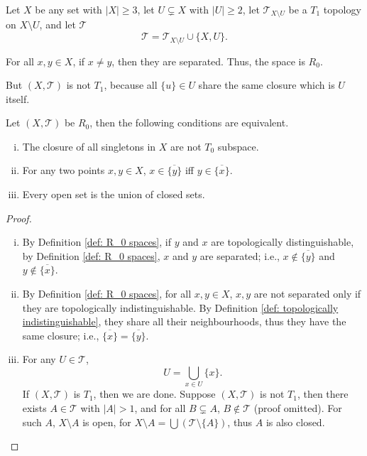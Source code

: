 \begin{example}
	\label{eg: R_0 but not T_1}

	Let $X$ be any set with $|X| \ge 3$, let $U \subsetneq X$ with $|U| \ge 2$, let $\mathcal T_{X \setminus U}$ be a $T_1$ topology on $X \setminus U$, and let $\mathcal T$
	$$
	\mathcal T = \mathcal T_{X \setminus U} \cup \{X, U\}.
	$$

	For all $x,y \in X$, if $x \ne y$, then they are separated. Thus, the space is $R_0$.

	But $(X, \mathcal T)$ is not $T_1$, because all $\{u\} \in U$ share the same closure which is $U$ itself.
\end{example}


\begin{proposition}
	\label{prop: alternative definitions of R_0 spaces}
	Let $(X, \mathcal T)$ be $R_0$, then the following conditions are equivalent.
	\begin{enumerate}[(i)]
		\item
		The closure of all singletons in $X$ are not $T_0$ subspace.

		\item
		For any two points $x,y \in X$, $x \in \overline{ \{y\} }$ iff $y \in \overline{ \{x\} }$.

		\item
		Every open set is the union of closed sets.
	\end{enumerate}

	\begin{proof}
		\
		\begin{enumerate}[(i)]
			\item
			By Definition \ref{def: R_0 spaces}, if $y$ and $x$ are topologically distinguishable, by Definition \ref{def: R_0 spaces}, $x$ and $y$ are separated; i.e., $x \notin \overline {\{y\}}$ and $y \notin \overline{\{x\}}$.

			\item
			By Definition \ref{def: R_0 spaces}, for all $x,y \in X$, $x,y$ are not separated only if they are topologically indistinguishable. By Definition \ref{def: topologically indistinguishable}, they share all their neighbourhoods, thus they have the same closure; i.e., $\overline{\{x\}} = \overline{\{y\}}$.

			\item
			For any $U \in \mathcal T$,
			$$
			U = \bigcup_{x \in U} \{x\}.
			$$
			If $(X, \mathcal T)$ is $T_1$, then we are done. Suppose $(X, \mathcal T)$ is not $T_1$, then there exists $A \in \mathcal T$ with $|A| > 1$, and for all $B \subsetneq A$, $B \notin \mathcal T$ (proof omitted). For such $A$, $X \setminus A$ is open, for $X \setminus A = \bigcup (\mathcal T \setminus \{A\})$, thus $A$ is also closed.


\end{enumerate}
\end{proof}
\end{proposition}
